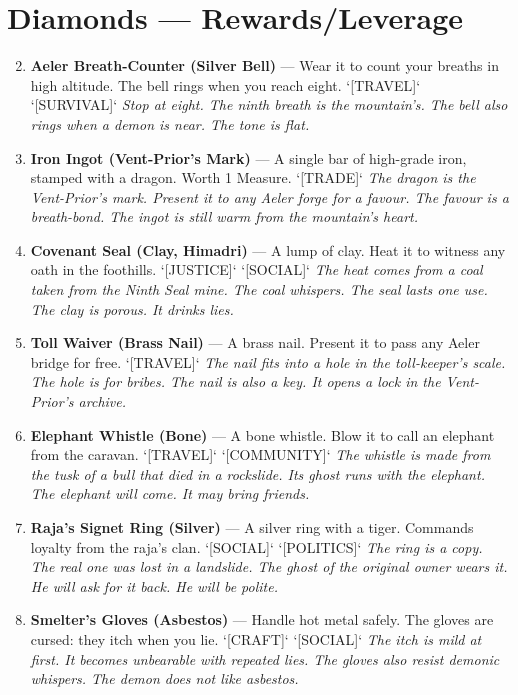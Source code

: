 \section*{Diamonds --- Rewards/Leverage}
\label{sec:himadri-rewards}
\begin{enumerate}
\setcounter{enumi}{1}
\item \textbf{Aeler Breath-Counter (Silver Bell)} --- Wear it to count your breaths in high altitude. The bell rings when you reach eight. `[TRAVEL]` `[SURVIVAL]`
  \hfill \textit{Stop at eight. The ninth breath is the mountain's. The bell also rings when a demon is near. The tone is flat.}
\item \textbf{Iron Ingot (Vent-Prior's Mark)} --- A single bar of high-grade iron, stamped with a dragon. Worth 1 Measure. `[TRADE]`
  \hfill \textit{The dragon is the Vent-Prior's mark. Present it to any Aeler forge for a favour. The favour is a breath-bond. The ingot is still warm from the mountain's heart.}
\item \textbf{Covenant Seal (Clay, Himadri)} --- A lump of clay. Heat it to witness any oath in the foothills. `[JUSTICE]` `[SOCIAL]`
  \hfill \textit{The heat comes from a coal taken from the Ninth Seal mine. The coal whispers. The seal lasts one use. The clay is porous. It drinks lies.}
\item \textbf{Toll Waiver (Brass Nail)} --- A brass nail. Present it to pass any Aeler bridge for free. `[TRAVEL]`
  \hfill \textit{The nail fits into a hole in the toll-keeper's scale. The hole is for bribes. The nail is also a key. It opens a lock in the Vent-Prior's archive.}
\item \textbf{Elephant Whistle (Bone)} --- A bone whistle. Blow it to call an elephant from the caravan. `[TRAVEL]` `[COMMUNITY]`
  \hfill \textit{The whistle is made from the tusk of a bull that died in a rockslide. Its ghost runs with the elephant. The elephant will come. It may bring friends.}
\item \textbf{Raja's Signet Ring (Silver)} --- A silver ring with a tiger. Commands loyalty from the raja's clan. `[SOCIAL]` `[POLITICS]`
  \hfill \textit{The ring is a copy. The real one was lost in a landslide. The ghost of the original owner wears it. He will ask for it back. He will be polite.}
\item \textbf{Smelter's Gloves (Asbestos)} --- Handle hot metal safely. The gloves are cursed: they itch when you lie. `[CRAFT]` `[SOCIAL]`
  \hfill \textit{The itch is mild at first. It becomes unbearable with repeated lies. The gloves also resist demonic whispers. The demon does not like asbestos.}

\end{enumerate}
